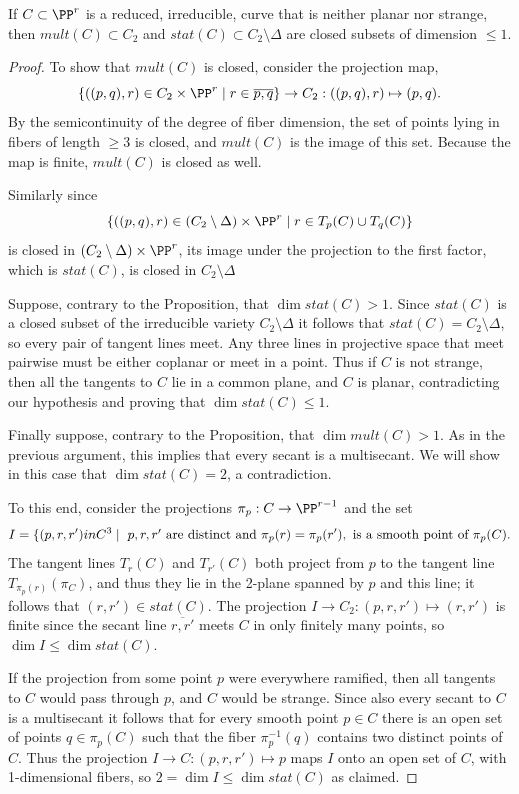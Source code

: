 \begin{proposition}\label{mult and stat}
 If $C\subset \PP^r$ is a reduced, irreducible, curve that is neither planar nor strange, then $mult(C)\subset C_2$
 and $stat(C)\subset C_2\setminus \Delta$ are closed subsets of dimension $\leq 1$.
\end{proposition}

\begin{proof}
To show that $mult(C)$ is closed, consider the projection map, 
$$
\{((p,q), r) \in C_2\times \PP^r \mid r \in \overline{p,q}\} \to C_2 : ((p,q),r)\mapsto (p,q).
$$
By the semicontinuity of the degree of fiber dimension, the set of points lying in fibers
of length $\geq 3$ is closed, and $mult(C)$ is the image of this set. Because the map is finite, 
$mult(C)$  is closed as well.

Similarly since 
$$
\{((p,q), r) \in (C_2\setminus \Delta)\times \PP^r \mid r \in T_p(C)\cup T_q(C) \}
$$
is closed in $(C_2\setminus \Delta)\times \PP^r$, its image under the projection to the first factor,
which is $stat(C)$, is closed in $C_2\setminus \Delta$

Suppose, contrary to the Proposition, that $\dim stat(C) >1$. Since $stat(C)$ is a closed subset of the irreducible variety $C_2\setminus \Delta$ it
follows that $stat(C) = C_2\setminus \Delta$, so every pair of tangent lines meet. Any three
lines in projective space that meet pairwise must be either coplanar or meet in a point. Thus if $C$ is not strange,
then all the tangents to $C$ lie in a common plane, and $C$ is planar, contradicting our hypothesis
and proving that $\dim stat(C)\leq 1$.

Finally suppose, contrary to the Proposition,  that $\dim mult(C)>1$. As in the previous argument, this
implies that every secant is a multisecant.  We will show in this case that $\dim stat(C) =2$, a contradiction. 

To this end, consider the projections $\pi_{p}: C \to \PP^{r-1}$ and the set  
$$
I = \{(p,r,r') in C^3 \mid \hbox{ $p,r,r'$ are distinct and } \pi_{p}(r) = \pi_{p}(r'), \hbox{ is a smooth point of $\pi_p(C)$}.
$$
The tangent lines $T_r(C)$ and $T_{r'}(C)$ both project from $p$ to the tangent line $T_{\pi_p(r)}(\pi_C)$,
and thus they lie in the 2-plane spanned by $p$ and this line; it follows that $(r,r') \in stat(C)$.
The projection $I \to C_2: (p,r,r') \mapsto (r,r')$ is finite since the secant line $\overline{r,r'}$ meets $C$ in only finitely many points, 
so $\dim I \leq \dim stat(C)$.

 If the projection from some point $p$ were everywhere ramified,
then all tangents to $C$ would pass through $p$, and $C$ would be strange.
Since also every secant to $C$ is a multisecant it follows that  for every smooth point $p\in C$ there is an open set of points $q\in \pi_p(C)$ such that
the fiber $\pi_p^{-1}(q)$ contains two distinct points of $C$. Thus the projection $I \to C: (p,r,r') \mapsto p$ maps
$I$ onto an open set of $C$, with 1-dimensional fibers, so $2 = \dim I\leq \dim stat(C)$ as claimed. \end{proof}


